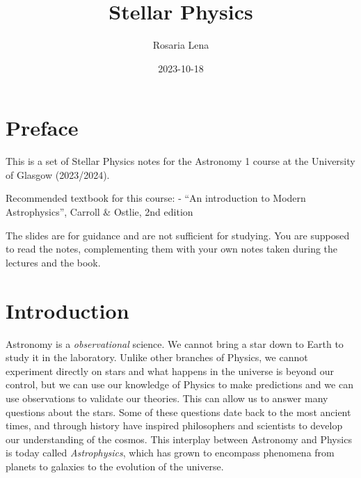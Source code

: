 \documentclass[
  letterpaper,
  DIV=11,
  numbers=noendperiod]{scrreprt}
\title{Stellar Physics}
\author{Rosaria Lena}
\date{2023-10-18}
\renewcommand*\contentsname{Table of contents}
\newcommand\contentsname{Table of contents}
\begin{document}
\maketitle
\ifdefined\Shaded\renewenvironment{Shaded}{\begin{tcolorbox}[borderline west={3pt}{0pt}{shadecolor}, frame hidden, interior hidden, sharp corners, breakable, enhanced, boxrule=0pt]}{\end{tcolorbox}}\fi

\renewcommand*\contentsname{Table of contents}
{
\hypersetup{linkcolor=}
\setcounter{tocdepth}{2}
\tableofcontents
}

\hypertarget{preface}{%
\chapter*{Preface}\label{preface}}


This is a set of Stellar Physics notes for the Astronomy 1 course at the
University of Glasgow (2023/2024).

Recommended textbook for this course: - ``An introduction to Modern
Astrophysics'', Carroll \& Ostlie, 2nd edition

The slides are for guidance and are not sufficient for studying. You are
supposed to read the notes, complementing them with your own notes taken
during the lectures and the book.


\hypertarget{introduction}{%
\chapter*{Introduction}\label{introduction}}


Astronomy is a \emph{observational} science. We cannot bring a star down
to Earth to study it in the laboratory. Unlike other branches of
Physics, we cannot experiment directly on stars and what happens in the
universe is beyond our control, but we can use our knowledge of Physics
to make predictions and we can use observations to validate our
theories. This can allow us to answer many questions about the stars.
Some of these questions date back to the most ancient times, and through
history have inspired philosophers and scientists to develop our
understanding of the cosmos. This interplay between Astronomy and
Physics is today called \emph{Astrophysics}, which has grown to
encompass phenomena from planets to galaxies to the evolution of the
universe.
\end{document}
